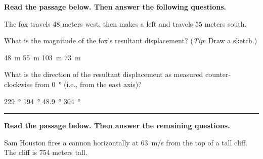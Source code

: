 \documentclass{exam}
\begin{document}
\begin{questions}
\clearpage
\begin{EnvUplevel}
\textbf{Read the passage below. Then answer the following questions.}

The fox travels 48 meters west, then makes a left and travels 55 meters south.
\end{EnvUplevel}

\question
 What is the magnitude of the fox's resultant displacement? (\textit{Tip}: Draw a sketch.)

\begin{choices}
    \choice \SI{48}{m}
    \choice \SI{55}{m}
    \choice \SI{103}{m}
    \correctchoice \SI{73}{m}
\end{choices}

\question
What is the direction of the resultant displacement as measured counter-clockwise from \SI{0}{\degree} (i.e., from the east axis)?

\begin{choices}
    \correctchoice \SI{229}{\degree}
    \choice \SI{194}{\degree}
    \choice \SI{48.9}{\degree}
    \choice \SI{304}{\degree}
\end{choices}
\vspace{1em}
\hrule

\begin{EnvUplevel}
    \textbf{Read the passage below. Then answer the remaining questions.}
    
    Sam Houston fires a cannon horizontally at \SI{63}{m/s} from the top of a tall cliff. The cliff is 754 meters tall.
\end{EnvUplevel}

\begin{figure}[h!]
    \centering
\end{figure}


\end{questions}
\end{document}
